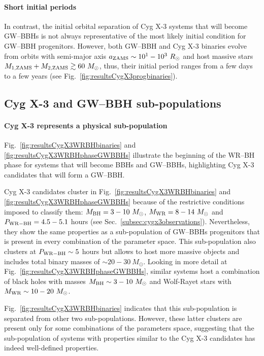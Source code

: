\documentclass[a4paper,titlepage]{book}     	%
\newcommand{\sun}{\ensuremath{_\odot}}
\newcommand{\msun}{\ensuremath{M\sun}}
\newcommand{\rsun}{R_{\odot}}
\newcommand{\mwr}{\ensuremath{M_\textup{WR}}}
\newcommand{\mbh}{\ensuremath{M_\textup{BH}}}
\begin{document}
\paragraph{Short initial periods} In contrast, the initial orbital separation of Cyg X-3 systems that will become GW--BBHs is not always representative of the most likely initial condition for GW--BBH progenitors. However, both GW--BBH and Cyg X-3 binaries evolve from orbits with semi-major axis $a_{\rm ZAMS} \sim 10^1-10^3~\rsun$ and host massive stars $M_{\rm 1,ZAMS} + M_{\rm 2,ZAMS} \gtrsim 60~\msun$, thus, their initial period ranges from a few days to a few years (see Fig.\ \ref{fig:resultsCygX3progbinaries}).

\subsection{Cyg X-3 and GW--BBH sub-populations}\label{subsec:CygX3phasevsGWBBHs}
\paragraph{Cyg X-3 represents a physical sub-population} Fig.\ \ref{fig:resultsCygX3WRBHbinaries} and \ref{fig:resultsCygX3WRBHphaseGWBBHs} illustrate the beginning of the WR--BH phase for systems that will become BBHs and GW--BBHs, highlighting Cyg X-3 candidates that will form a GW--BBH. 

Cyg X-3 candidates cluster in Fig.\ \ref{fig:resultsCygX3WRBHbinaries} and \ref{fig:resultsCygX3WRBHphaseGWBBHs} because of the restrictive conditions imposed to classify them: $\mbh = 3-10~\msun$, $\mwr = 8-14~\msun$ and $P_{\rm WR-BH}=4.5-5.1$ hours (see Sec.\ \ref{subsec:cygx3observations}). Nevertheless, they show the same properties as a sub-population of GW--BBHs progenitors that is present in every combination of the parameter space. This sub-population also clusters at $P_{\rm WR-BH} \sim 5$ hours but allows to host more massive objects and includes total binary masses of $\sim 20-30~\msun$. Looking in more detail at Fig.\ \ref{fig:resultsCygX3WRBHphaseGWBBHs}, similar systems host a combination of black holes with masses $\mbh \sim 3-10~\msun$ and Wolf-Rayet stars with $\mwr \sim 10-20~\msun$. 

Fig.\ \ref{fig:resultsCygX3WRBHbinaries} indicates that this sub-population is separated from other two sub-populations. However, these latter clusters are present only for some combinations of the parameters space, suggesting that the sub-population of systems with properties similar to the Cyg X-3 candidates has indeed well-defined properties.
\end{document}
